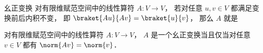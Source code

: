 
\begin{issues}
\issueDraft
\end{issues}


\begin{definition}{幺正变换}
对有限维赋范空间中的线性算符 $A: V\to V$， 若对任意 $u, v \in V$ 都满足变换前后内积不变， 即 $\braket{Au}{Av} = \braket{u}{v}$， 那么 $A$ 就是
\end{definition}

\begin{theorem}{}
对有限维赋范空间中的线性算符 $A: V\to V$， $A$ 是一个幺正变换当且仅当对任意 $v\in V$ 都有 $\norm{Av} = \norm{v}$．
\end{theorem}
